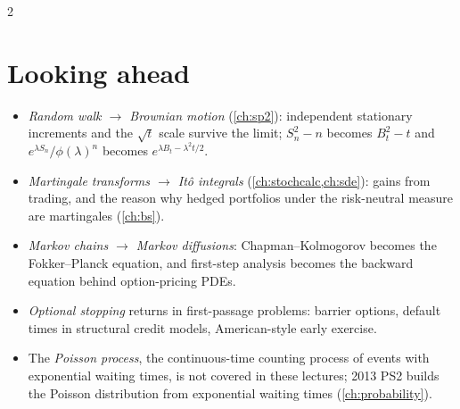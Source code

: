 \begin{paracol}{2}
\section{Looking ahead}\label{ch04:sec-ahead}
\begin{itemize}
  \item \emph{Random walk $\to$ Brownian motion} (\cref{ch:sp2}): independent stationary increments and the $\sqrt t$
        scale survive the limit; $S_n^2-n$ becomes $B_t^2-t$ and $e^{\lambda S_n}/\phi(\lambda)^n$ becomes
        $e^{\lambda B_t-\lambda^2t/2}$.
  \item \emph{Martingale transforms $\to$ It\^o integrals} (\cref{ch:stochcalc,ch:sde}): gains from trading, and the
        reason why hedged portfolios under the risk-neutral measure are martingales (\cref{ch:bs}).
  \item \emph{Markov chains $\to$ Markov diffusions}: Chapman--Kolmogorov becomes the Fokker--Planck equation, and
        first-step analysis becomes the backward equation behind option-pricing PDEs.
  \item \emph{Optional stopping} returns in first-passage problems: barrier options, default times in structural credit
        models, American-style early exercise.
  \item The \emph{Poisson process}, the continuous-time counting process of events with exponential waiting times, is
        not covered in these lectures; 2013 PS2 builds the Poisson distribution from exponential waiting times
        (\cref{ch:probability}).
\end{itemize}


\end{paracol}
